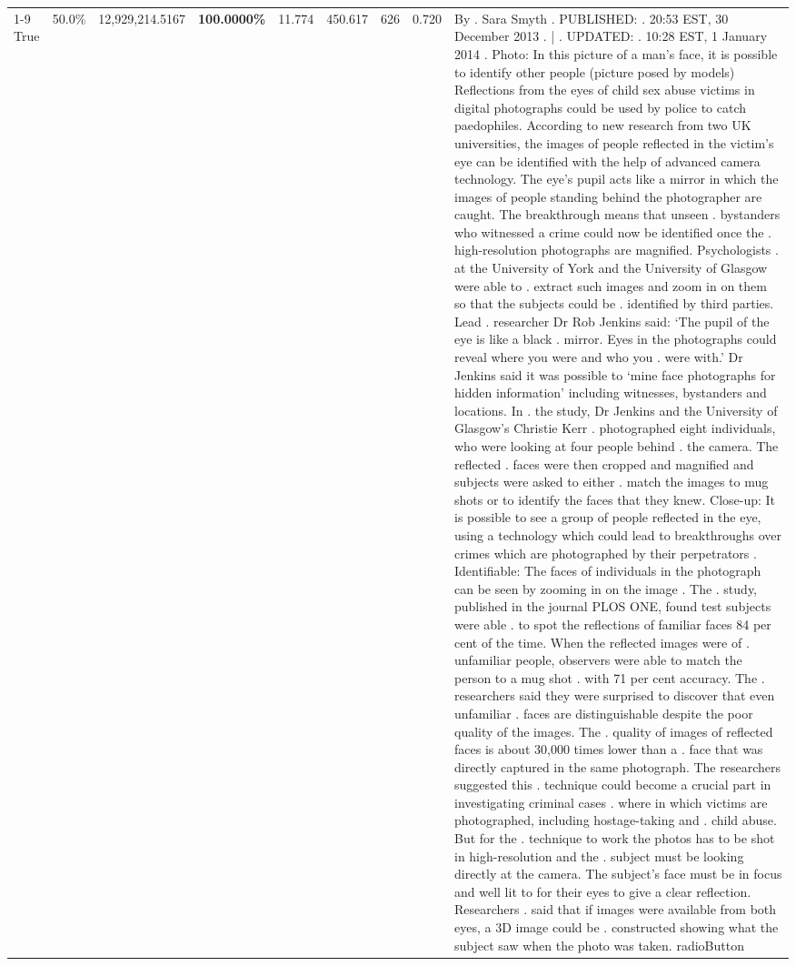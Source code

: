 \begin{table}[H]
\begin{tabular}{lllrlllll}
\cline{1-9}
True & 50.0\% & 12,929,214.5167 & \bfseries \color{red} 100.0000\% & 11.774 & 450.617 & 626 & 0.720 & By . Sara Smyth . PUBLISHED: . 20:53 EST, 30 December 2013 . | . UPDATED: . 10:28 EST, 1 January 2014 . Photo: In this picture of a man's face, it is possible to identify other people (picture posed by models) Reflections from the eyes of child sex abuse victims in digital photographs could be used by police to catch paedophiles. According to new research from two UK universities, the images of people reflected in the victim's eye can be identified with the help of advanced camera technology. The eye's pupil acts like a mirror in which the images of people standing behind the photographer are caught. The breakthrough means that unseen . bystanders who witnessed a crime could now be identified once the . high-resolution photographs are magnified. Psychologists . at the University of York and the University of Glasgow were able to . extract such images and zoom in on them so that the subjects could be . identified by third parties. Lead . researcher Dr Rob Jenkins said: ‘The pupil of the eye is like a black . mirror. Eyes in the photographs could reveal where you were and who you . were with.' Dr Jenkins said it was possible to ‘mine face photographs for hidden information' including witnesses, bystanders and locations. In . the study, Dr Jenkins and the University of Glasgow's Christie Kerr . photographed eight individuals, who were looking at four people behind . the camera. The reflected . faces were then cropped and magnified and subjects were asked to either . match the images to mug shots or to identify the faces that they knew. Close-up: It is possible to see a group of people reflected in the eye, using a technology which could lead to breakthroughs over crimes which are photographed by their perpetrators . Identifiable: The faces of individuals in the photograph can be seen by zooming in on the image . The . study, published in the journal PLOS ONE, found test subjects were able . to spot the reflections of familiar faces 84 per cent of the time. When the reflected images were of . unfamiliar people, observers were able to match the person to a mug shot . with 71 per cent accuracy. The . researchers said they were surprised to discover that even unfamiliar . faces are distinguishable despite the poor quality of the images. The . quality of images of reflected faces is about 30,000 times lower than a . face that was directly captured in the same photograph. The researchers suggested this . technique could become a crucial part in investigating criminal cases . where in which victims are photographed, including hostage-taking and . child abuse. But for the . technique to work the photos has to be shot in high-resolution and the . subject must be looking directly at the camera. The subject's face must be in focus and well lit to for their eyes to give a clear reflection. Researchers . said that if images were available from both eyes, a 3D image could be . constructed showing what the subject saw when the photo was taken. radioButton \\

\end{tabular}
\end{table}
